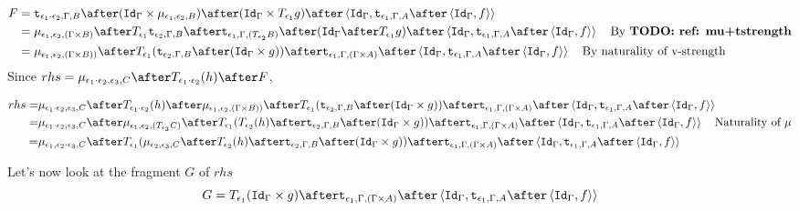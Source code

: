 \documentclass{report}
\begin{document}
\begin{equation}
    \begin{split}
        F & = \tstrength{\e_1\dot\e_2}{\G}{B}\after(\idg\times\bind{\e_1}{\e_2}{B})\after(\idg\times\T{\e_1}{g})\after\pr{\idg}{\tstrength{\e_1}{\G}{A}\after\pr{\idg}{f}}\\
        &  = \bind{\e_1}{\e_2}{(\G\times B)} \after \T{\e_1}{\tstrength{\e_2}{\G}{B}} \after\tstrength{\e_1}{\G}{(\T{\e_2}{B})} \after (\idg \after\T{\e_1}{g})\after\pr{\idg}{\tstrength{\e_1}{\G}{A}\after\pr{\idg}{f}}\qt{By \todo{ref: mu+tstrength}}
        \\ & = \bind{\e_1}{\e_2}{(\G \times B))} \after \T{\e_1}{(\tstrength{\e_2}{\G}{B} \after (\idg \times g))} \after \tstrength{\e_1}{\G}{(\G \times A)} \after \pr{\idg}{\tstrength{\e_1}{\G}{A}\after\pr{\idg}{f}}\qt{By naturality of v-strength}
    \end{split}
\end{equation}
Since
$
    rhs = \bind{\e_1\dot\e_2}{\e_3}{C}\after\T{\e_1\dot\e_2}{(h)}\after F
$, 

\begin{equation}
    \begin{split}
        rhs = &\bind{\e_1\dot\e_2}{\e_3}{C}\after\T{\e_1\dot\e_2}{(h)}\after\bind{\e_1}{\e_2}{(\G \times B))} \after \T{\e_1}{(\tstrength{\e_2}{\G}{B} \after (\idg \times g))} \after \tstrength{\e_1}{\G}{(\G \times A)} \after \pr{\idg}{\tstrength{\e_1}{\G}{A}\after\pr{\idg}{f}}\\
        = &\bind{\e_1\dot\e_2}{\e_3}{C}\after\bind{\e_1}{\e_2}{(\T{\e_3}{C})}\after\T{\e_1}{(\T{\e_2}{(h)} \after \tstrength{\e_2}{\G}{B} \after (\idg \times g))} \after \tstrength{\e_1}{\G}{(\G \times A)} \after \pr{\idg}{\tstrength{\e_1}{\G}{A}\after\pr{\idg}{f}}\qt{Naturality of $\mu$}\\
        = & \bind{\e_1}{\e_2\dot\e_3}{C}\after\T{\e_1}{(\bind{\e_2}{\e_3}{C}\after \T{\e_2}{(h)} \after \tstrength{\e_2}{\G}{B} \after (\idg \times g))} \after \tstrength{\e_1}{\G}{(\G \times A)} \after \pr{\idg}{\tstrength{\e_1}{\G}{A}\after\pr{\idg}{f}}
    \end{split}
\end{equation}

Let's now look at the fragment $G$ of $rhs$
\begin{equation}
    G = \T{\e_1}{(\idg\times g)}\after\tstrength{\e_1}{\G}{(\G\times A)}\after\pr{\idg}{\tstrength{\e_1}{\G}{A}\after\pr{\idg}{f}}
\end{equation}
\end{document}
